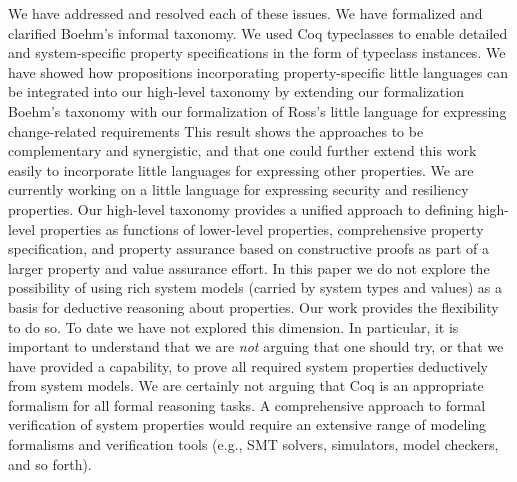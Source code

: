 \documentclass[conference]{IEEEtran}
\begin{document}
We have addressed and resolved each of these issues.  We have formalized and clarified Boehm's informal taxonomy. We used Coq typeclasses to enable detailed and system-specific property specifications in the form of typeclass instances. We have showed how propositions incorporating property-specific little languages can be integrated into our high-level taxonomy by extending our formalization Boehm's taxonomy with our formalization of Ross's little language for expressing change-related requirements This result shows the approaches to be complementary and synergistic, and that one could further extend this work easily to incorporate little languages for expressing other properties. We are currently working on a little language for expressing security and resiliency properties. Our high-level taxonomy provides a unified approach to defining high-level properties as functions of lower-level properties, comprehensive property specification, and property assurance based on constructive proofs as part of a larger property and value assurance effort. In this paper we do not explore the possibility of using rich system models (carried by system types and values) as a basis for deductive reasoning about properties. Our work provides the flexibility to do so. To date we have not explored this dimension. In particular, it is important to understand that we are {\em not} arguing that one should try, or that we have provided a capability, to prove all required system properties deductively from system models. We are certainly not arguing that Coq is an appropriate formalism for all formal reasoning tasks. A comprehensive approach to formal verification of system properties would require an extensive range of modeling formalisms and verification tools (e.g., SMT solvers, simulators, model checkers, and so forth). 

\end{document}
